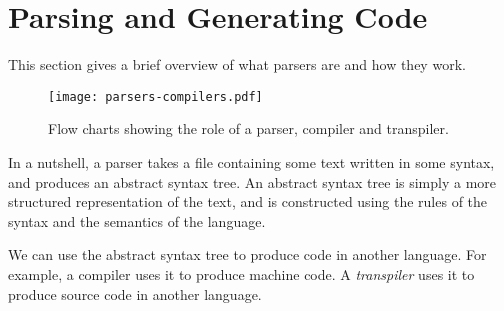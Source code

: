 \section{Parsing and Generating Code} %
\label{sec:parsing_and_generating}
This section gives a brief overview of what parsers are and how they work.

\begin{figure}
  \centering
  \texttt{[image: parsers-compilers.pdf]} 
  \caption{Flow charts showing the role of a parser, compiler and transpiler.}
  \label{fig:parsers-compilers}
\end{figure}

In a nutshell, a parser takes a file containing some text written in some syntax, and produces an abstract syntax tree. An abstract syntax tree is simply a more structured representation of the text, and is constructed using the rules of the syntax and the semantics of the language. 

We can use the abstract syntax tree to produce code in another language. For example, a compiler uses it to produce machine code. A \emph{transpiler} uses it to produce source code in another language.


